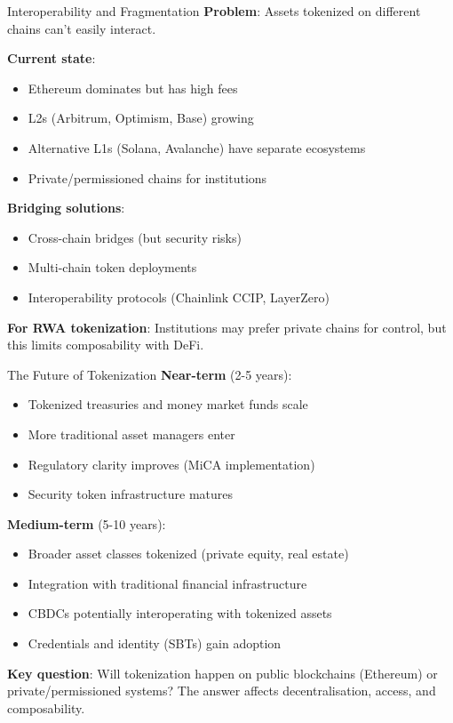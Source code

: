 \documentclass[10pt]{beamer}
\begin{document}
\begin{frame}{Interoperability and Fragmentation}
  \textbf{Problem}: Assets tokenized on different chains can't easily interact.
  
  \vspace{0.5em}
  \textbf{Current state}:
  \begin{itemize}
    \item Ethereum dominates but has high fees
    \item L2s (Arbitrum, Optimism, Base) growing
    \item Alternative L1s (Solana, Avalanche) have separate ecosystems
    \item Private/permissioned chains for institutions
  \end{itemize}
  
  \vspace{0.5em}
  \textbf{Bridging solutions}:
  \begin{itemize}
    \item Cross-chain bridges (but security risks)
    \item Multi-chain token deployments
    \item Interoperability protocols (Chainlink CCIP, LayerZero)
  \end{itemize}
  
  \vspace{0.5em}
  \textbf{For RWA tokenization}: Institutions may prefer private chains for control, but this limits composability with DeFi.
\end{frame}

\begin{frame}{The Future of Tokenization}
  \textbf{Near-term} (2-5 years):
  \begin{itemize}
    \item Tokenized treasuries and money market funds scale
    \item More traditional asset managers enter
    \item Regulatory clarity improves (MiCA implementation)
    \item Security token infrastructure matures
  \end{itemize}
  
  \vspace{0.5em}
  \textbf{Medium-term} (5-10 years):
  \begin{itemize}
    \item Broader asset classes tokenized (private equity, real estate)
    \item Integration with traditional financial infrastructure
    \item CBDCs potentially interoperating with tokenized assets
    \item Credentials and identity (SBTs) gain adoption
  \end{itemize}
  
  \vspace{0.5em}
  \textbf{Key question}: Will tokenization happen on public blockchains (Ethereum) or private/permissioned systems? The answer affects decentralisation, access, and composability.
\end{frame}
\end{document}
